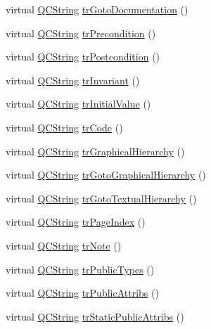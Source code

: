 \begin{DoxyCompactItemize}
\item 
virtual \hyperlink{class_q_c_string}{Q\+C\+String} \hyperlink{class_translator_norwegian_a0dc5533adfc9908456985c664115e6a7}{tr\+Goto\+Documentation} ()
\item 
virtual \hyperlink{class_q_c_string}{Q\+C\+String} \hyperlink{class_translator_norwegian_af5d99cff63e361a35082769d6333ee64}{tr\+Precondition} ()
\item 
virtual \hyperlink{class_q_c_string}{Q\+C\+String} \hyperlink{class_translator_norwegian_ac21330f4db8f249fc193e9d0363e6089}{tr\+Postcondition} ()
\item 
virtual \hyperlink{class_q_c_string}{Q\+C\+String} \hyperlink{class_translator_norwegian_a16488d8710c0fcdb2866f260bdc9bb3f}{tr\+Invariant} ()
\item 
virtual \hyperlink{class_q_c_string}{Q\+C\+String} \hyperlink{class_translator_norwegian_a0599a31dcae83d35b8ca12d6c77adf2a}{tr\+Initial\+Value} ()
\item 
virtual \hyperlink{class_q_c_string}{Q\+C\+String} \hyperlink{class_translator_norwegian_a2eaf23003da213d49b1faa922d4123fd}{tr\+Code} ()
\item 
virtual \hyperlink{class_q_c_string}{Q\+C\+String} \hyperlink{class_translator_norwegian_a77f0c694f7193d4d8b8ffb70239de111}{tr\+Graphical\+Hierarchy} ()
\item 
virtual \hyperlink{class_q_c_string}{Q\+C\+String} \hyperlink{class_translator_norwegian_acf874ad0d57a0ed281725e85405bac36}{tr\+Goto\+Graphical\+Hierarchy} ()
\item 
virtual \hyperlink{class_q_c_string}{Q\+C\+String} \hyperlink{class_translator_norwegian_a909788196a97e8b5bf27b97b5600b4f9}{tr\+Goto\+Textual\+Hierarchy} ()
\item 
virtual \hyperlink{class_q_c_string}{Q\+C\+String} \hyperlink{class_translator_norwegian_af27a8d1a246a1140f5ce95d2ab2ca5b1}{tr\+Page\+Index} ()
\item 
virtual \hyperlink{class_q_c_string}{Q\+C\+String} \hyperlink{class_translator_norwegian_a9955fd3a2da219c1e0b62c6c89c2a627}{tr\+Note} ()
\item 
virtual \hyperlink{class_q_c_string}{Q\+C\+String} \hyperlink{class_translator_norwegian_a5d722105b7e4b4c250545d4342df7aa4}{tr\+Public\+Types} ()
\item 
virtual \hyperlink{class_q_c_string}{Q\+C\+String} \hyperlink{class_translator_norwegian_afb7ad70c4ce5b8e6d78da0917b6fc2e0}{tr\+Public\+Attribs} ()
\item 
virtual \hyperlink{class_q_c_string}{Q\+C\+String} \hyperlink{class_translator_norwegian_a72c54deae627f52e1678c96f92d63b01}{tr\+Static\+Public\+Attribs} ()

\end{DoxyCompactItemize}
